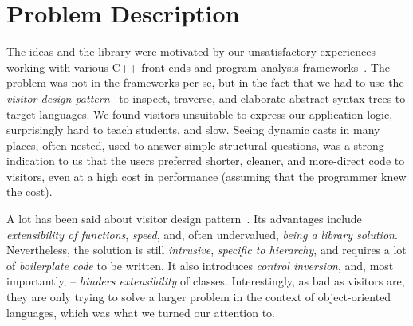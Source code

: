 \section{Problem Description} %
\label{sec:probl}

The ideas and the library were motivated by our unsatisfactory experiences 
working with various C++ front-ends and program analysis 
frameworks~\cite{Pivot09,Phoenix,Clang,Liz}.
The problem was not in the frameworks per se, but in the fact that we had to use
the \emph{visitor design pattern}~\cite{DesignPatterns1993} to inspect, traverse, and 
elaborate abstract syntax trees to target languages. We found visitors 
unsuitable to express our application logic, surprisingly hard to teach 
students, and slow. Seeing dynamic casts in many places, often nested, used to 
answer simple structural questions, was a strong indication to us that the users 
preferred shorter, cleaner, and more-direct code to visitors, even at a high 
cost in performance (assuming that the programmer knew the cost).

A lot has been said about visitor design pattern~\cite{DesignPatterns1993,Zenger:2001}. 
Its advantages include \emph{extensibility of functions}, \emph{speed}, and, 
often undervalued, \emph{being a library solution}. Nevertheless, the solution 
is still \emph{intrusive}, \emph{specific to hierarchy}, and requires a lot of 
\emph{boilerplate code} to be written. It also introduces \emph{control 
inversion}, and, most importantly, -- \emph{hinders extensibility} of classes.
Interestingly, as bad as visitors are, they are only trying to solve a larger 
problem in the context of object-oriented languages, which was what we turned 
our attention to.



